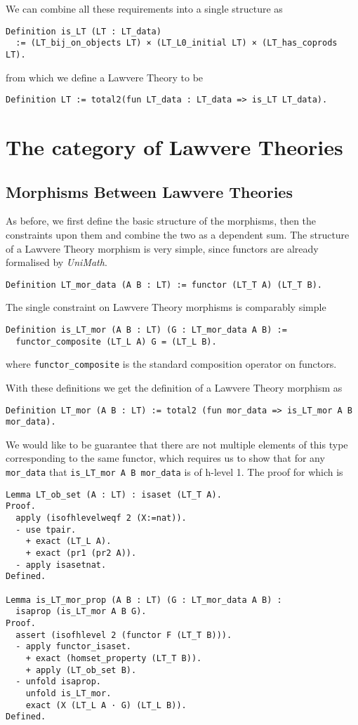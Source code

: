 We can combine all these requirements into a single structure as
\begin{lstlisting}
Definition is_LT (LT : LT_data)
  := (LT_bij_on_objects LT) × (LT_L0_initial LT) × (LT_has_coprods LT).
\end{lstlisting}
from which we define a Lawvere Theory to be
\begin{lstlisting}
Definition LT := total2(fun LT_data : LT_data => is_LT LT_data).
\end{lstlisting}

\section{The category of Lawvere Theories}
\subsection{Morphisms Between Lawvere Theories}
As before, we first define the basic structure of the morphisms, then the
constraints upon them and combine the two as a dependent sum. The structure of a
Lawvere Theory morphism is very simple, since functors are already formalised by
\textit{UniMath}.
\begin{lstlisting}
Definition LT_mor_data (A B : LT) := functor (LT_T A) (LT_T B).
\end{lstlisting}

The single constraint on Lawvere Theory morphisms is comparably simple
\begin{lstlisting}
Definition is_LT_mor (A B : LT) (G : LT_mor_data A B) := 
  functor_composite (LT_L A) G = (LT_L B).
\end{lstlisting}
where \lstinline|functor_composite| is the standard composition operator on functors.

With these definitions we get the definition of a Lawvere Theory morphism as
\begin{lstlisting}
Definition LT_mor (A B : LT) := total2 (fun mor_data => is_LT_mor A B mor_data).
\end{lstlisting}

We would like to be guarantee that there are not multiple elements of this type
corresponding to the same functor, which requires us to show that for any
\lstinline|mor_data| that \lstinline|is_LT_mor A B mor_data| is
of h-level 1. The proof for which is
\begin{lstlisting}
Lemma LT_ob_set (A : LT) : isaset (LT_T A).
Proof.
  apply (isofhlevelweqf 2 (X:=nat)).
  - use tpair.
    + exact (LT_L A).
    + exact (pr1 (pr2 A)).
  - apply isasetnat.
Defined.

Lemma is_LT_mor_prop (A B : LT) (G : LT_mor_data A B) : 
  isaprop (is_LT_mor A B G).
Proof.
  assert (isofhlevel 2 (functor F (LT_T B))).
  - apply functor_isaset.
    + exact (homset_property (LT_T B)).
    + apply (LT_ob_set B).
  - unfold isaprop.
    unfold is_LT_mor.
    exact (X (LT_L A · G) (LT_L B)).
Defined.
\end{lstlisting}

